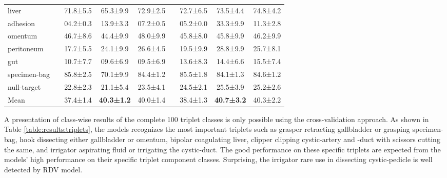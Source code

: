 \documentclass{article}
\begin{document}
{\begin{table}[ht]
{\begin{tabular}{@{}lrlcrllcr@{}}
        liver && 71.8±5.5 & 65.3±9.9 & 72.9±2.5 && 72.7±6.5 & 73.5±4.4 & 74.8±4.2 \\
        adhesion && 04.2±0.3 & 13.9±3.3 & 07.2±0.5 && 05.2±0.0 & 33.3±9.9 & 11.3±2.8 \\
        omentum && 46.7±8.6 & 44.4±9.9 & 48.0±9.9 && 45.8±8.0 & 45.8±9.9 & 46.2±9.9 \\
        peritoneum && 17.7±5.5 & 24.1±9.9 & 26.6±4.5 && 19.5±9.9 & 28.8±9.9 & 25.7±8.1 \\
        gut && 10.7±7.7 & 09.6±6.9 & 09.5±6.9 && 13.6±8.3 & 14.4±6.6 & 15.5±7.4 \\
        specimen-bag && 85.8±2.5 & 70.1±9.9 & 84.4±1.2 && 85.5±1.8 & 84.1±1.3 & 84.6±1.2 \\
        null-target && 22.8±2.3 & 21.1±5.4 & 23.5±4.1 && 24.5±2.1 & 25.5±3.9 & 25.2±2.6 \\
        \midrule
        Mean & & 37.4±1.4 & \bf 40.3±1.2 & 40.0±1.4 && 38.4±1.3 & \bf 40.7±3.2 & 40.3±2.2\\
         \bottomrule
    \end{tabular}
    }
\end{table}
%
 
A presentation of class-wise results of the complete 100 triplet classes is only possible using the cross-validation approach. 
As shown in Table \ref{table:results:triplets}, the models recognizes the most important triplets such as grasper retracting gallbladder or grasping specimen-bag, hook dissecting either gallbladder or omentum, bipolar coagulating liver, clipper clipping cystic-artery and -duct with scissors cutting the same, and irrigator aspirating fluid or irrigating the cystic-duct. 
The good performance on these specific triplets are expected from the models' high performance on their specific triplet component classes.
Surprising, the irrigator rare use in dissecting cystic-pedicle is well detected by RDV model.











}
\end{document}
